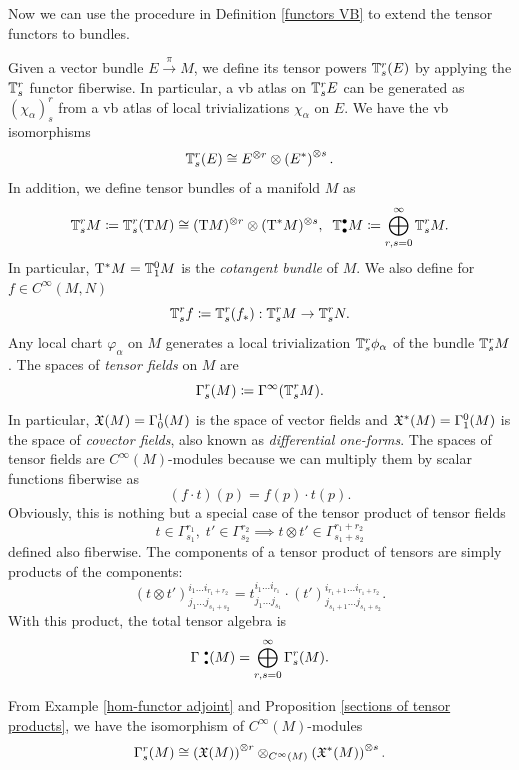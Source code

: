 Now we can use the procedure in Definition \ref{functors VB} to extend the tensor functors to bundles.

\begin{defn}
    Given a vector bundle $E\overset{\pi}{\to}M$, we define its tensor powers $\mathbb{T}^r_s (E)$ by applying the $\mathbb{T}^r_s$ functor fiberwise. In particular, a \gls{vb} atlas on $\mathbb{T}^r_s E$ can be generated as $(\chi_\alpha)^r_s$ from a \gls{vb} atlas of local trivializations $\chi_\alpha$ on $E$.
    We have the \gls{vb} isomorphisms
    \[
    \mathbb{T}^r_s (E)\cong E^{\otimes r}\otimes \left(E^\ast\right)^{\otimes s}.
    \]
    In addition, we define tensor bundles of a manifold $M$ as
    \[
    \mathbb{T}^r_s M\coloneqq \mathbb{T}^r_s (\mathrm{T} M)\cong (\mathrm{T} M)^{\otimes r}\otimes (\mathrm{T}^\ast M)^{\otimes s},\;\; \mathbb{T}^\bullet_\bullet M\coloneqq \bigoplus_{r,s=0}^\infty \mathbb{T}^r_s M.
    \]
    In particular, $\mathrm{T}^\ast M=\mathbb{T}^0_1 M$ is the \emph{cotangent bundle} of $M$. We also define for $f\in C^\infty(M,N)$ 
    \[ \mathbb{T}^r_s f\coloneqq \mathbb{T}^r_s (f_\ast): \mathbb{T}^r_s M\to \mathbb{T}^r_s N.\]
    Any local chart $\varphi_\alpha$ on $M$ generates a local trivialization $\mathbb{T}^r_s \phi_\alpha$ of the bundle $\mathbb{T}^r_s M$.
    The spaces of \emph{tensor fields} on $M$ are 
    \[
    \Gamma^r_s(M)\coloneqq \Gamma^\infty(\mathbb{T}^r_s M).
    \]
    In particular, $\mathfrak{X}(M)=\Gamma^1_0(M)$ is the space of vector fields and $\mathfrak{X}^\ast(M)=\Gamma^0_1(M)$ is the space of \emph{covector fields}, also known as \emph{differential one-forms}. The spaces of tensor fields are $C^\infty(M)$-modules because we can multiply them by scalar functions fiberwise as
    \[
    (f\cdot t)(p)=f(p)\cdot t(p).
    \]
    Obviously, this is nothing but a special case of the tensor product of tensor fields
    \[t\in\Gamma^{r_1}_{s_1},\;t'\in\Gamma^{r_2}_{s_2}\implies t\otimes t' \in \Gamma^{r_1+r_2}_{s_1+s_2}\] defined also fiberwise. The components of a tensor product of tensors are simply products of the components:
    \[
    (t\otimes t')_{j_1 \ldots j_{s_1+s_2}}^{i_1\ldots i_{r_1+r_2}}=t_{j_1\ldots j_{s_1}}^{i_1\ldots i_{r_1}}\cdot (t')^{i_{r_1+1}\ldots i_{r_1+r_2}}_{j_{s_1+1}\ldots j_{s_1+s_2}}.
    \]
    With this product, the total tensor algebra is 
    \[\Gamma^{\smbullet }_{\smbullet }(M)=\bigoplus_{r,s=0}^\infty \Gamma^r_s(M).\]
\end{defn}


\begin{cor}
    From Example \ref{hom-functor adjoint} and Proposition \ref{sections of tensor products}, we have the isomorphism of $C^\infty(M)$-modules
    \[\Gamma^r_s (M)\cong \left(\mathfrak{X}(M)\right)^{\otimes r} \otimes_{C^\infty(M)}\left(\mathfrak{X}^\ast(M)\right)^{\otimes s}.\]
\end{cor}

